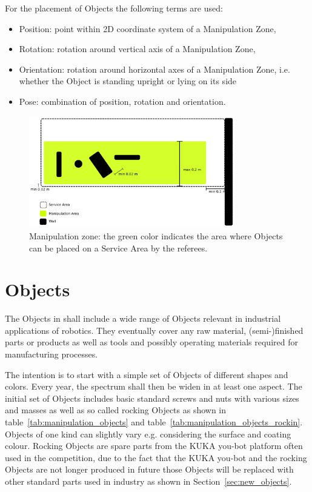 For the placement of Objects the following terms are used:

\begin{itemize}
	\item Position: point within 2D coordinate system of a Manipulation Zone,
	\item Rotation: rotation around vertical axis of a Manipulation Zone,
	\item Orientation: rotation around horizontal axes of a Manipulation Zone, i.e. whether the Object is standing upright or lying on its side
	\item Pose: combination of position, rotation and orientation.
\end{itemize}
\begin{figure} [h!]
\centering
\includegraphics[width=0.8\textwidth ]{./images/manipulation_zone.pdf}
\caption{Manipulation zone: the green color indicates the area where Objects can be placed on a Service Area by the referees.}
\label{fig:manipulation_zone}
\end{figure}

\clearpage
\section{Objects} \label{ssec:ManipulationObjects}
The Objects in \RCAW shall include a wide range of Objects relevant in industrial applications of robotics. They eventually cover any raw material, (semi-)finished parts or products as well as tools and possibly operating materials required for manufacturing processes.
\par

The intention is to start with a simple set of Objects of different shapes and colors. Every year, the spectrum shall then be widen in at least one aspect. 
The initial set of Objects includes basic standard screws and nuts with various sizes and masses as well as so called rocking Objects as shown in table~\ref{tab:manipulation_objects} and table~\ref{tab:manipulation_objects_rockin}. Objects of one kind can slightly vary e.g. considering the surface and coating colour. 
Rocking Objects are spare parts from the KUKA you-bot platform often used in the competition, due to the fact that the KUKA you-bot and the rocking Objects are not longer produced in future those Objects will be replaced with other standard parts used in industry as shown in Section~\ref{sec:new_objects}. 

